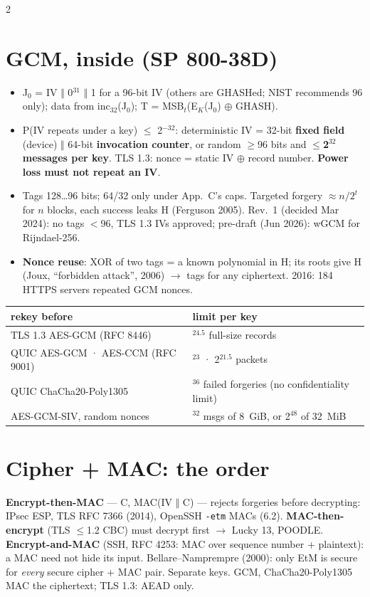 \documentclass[8pt]{extarticle}
\newcommand\ct[1]{\texttt{#1}}
\begin{document}
\begin{multicols}{2}
\section{GCM, inside (SP 800-38D)}
\begin{itemize}
  \item J$_0$ = IV $\Vert$ 0$^{31}$ $\Vert$ 1 for a 96-bit IV (others are GHASHed; NIST
        recommends 96 only); data from inc$_{32}$(J$_0$); T = MSB$_t$(E$_K$(J$_0$) $\oplus$ GHASH).
  \item P(IV repeats under a key) $\le$ 2$^{-32}$: deterministic IV = 32-bit \textbf{fixed field}
        (device) $\Vert$ 64-bit \textbf{invocation counter}, or random $\ge$96 bits and
        $\le$\textbf{2$^{32}$ messages per key}. TLS 1.3: nonce = static IV $\oplus$ record number.
        \textbf{Power loss must not repeat an IV}.
  \item Tags 128…96 bits; 64/32 only under App.~C's caps. Targeted forgery $\approx n/2^t$ for $n$
        blocks, each success leaks H (Ferguson 2005). Rev.~1 (decided Mar 2024): no tags $<$96, TLS
        1.3 IVs approved; pre-draft (Jun 2026): wGCM for Rijndael-256.
  \item \textbf{Nonce reuse}: XOR of two tags = a known polynomial in H; its roots give H (Joux,
        ``forbidden attack'', 2006) $\to$ tags for any ciphertext. 2016: 184 HTTPS servers repeated
        GCM nonces.
\end{itemize}
{\scriptsize\setlength{\tabcolsep}{2pt}
\begin{tabular}{@{}>{\raggedright\arraybackslash}p{33mm}>{\raggedright\arraybackslash}p{42mm}@{}}
\toprule
\textbf{rekey before} & \textbf{limit per key}\\ \midrule
TLS 1.3 AES-GCM (RFC 8446) & 2$^{24.5}$ full-size records\\
QUIC AES-GCM · AES-CCM (RFC 9001) & 2$^{23}$ · 2$^{21.5}$ packets\\
QUIC ChaCha20-Poly1305 & 2$^{36}$ failed forgeries (no confidentiality limit)\\
AES-GCM-SIV, random nonces & 2$^{32}$ msgs of 8~GiB, or 2$^{48}$ of 32~MiB\\
\bottomrule
\end{tabular}}

\section{Cipher + MAC: the order}
\textbf{Encrypt-then-MAC} — C, MAC(IV $\Vert$ C) — rejects forgeries before decrypting: IPsec ESP,
TLS RFC 7366 (2014), OpenSSH \ct{-etm} MACs (6.2). \textbf{MAC-then-encrypt} (TLS $\le$1.2 CBC)
must decrypt first $\to$ Lucky 13, POODLE. \textbf{Encrypt-and-MAC} (SSH, RFC 4253: MAC over
sequence number + plaintext): a MAC need not hide its input.
Bellare–Namprempre (2000): only EtM is secure for \emph{every} secure cipher + MAC pair. Separate
keys. GCM, ChaCha20-Poly1305 MAC the ciphertext; TLS 1.3: AEAD only.


\end{multicols}
\end{document}
